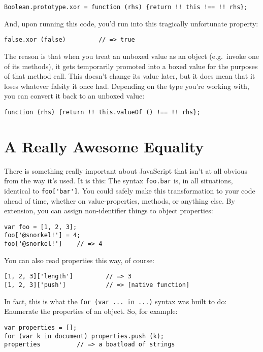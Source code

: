 \documentclass{article}
\begin{document}
\begin{verbatim}
Boolean.prototype.xor = function (rhs) {return !! this !== !! rhs};
\end{verbatim}

    And, upon running this code, you'd run into this tragically unfortunate property:

\begin{verbatim}
false.xor (false)         // => true
\end{verbatim}

    The reason is that when you treat an unboxed value as an object (e.g.~invoke one of its methods), it gets temporarily promoted into a boxed value for the purposes of that method call.
    This doesn't change its value later, but it does mean that it loses whatever falsity it once had. Depending on the type you're working with, you can convert it back to an unboxed value:

\begin{verbatim}
function (rhs) {return !! this.valueOf () !== !! rhs};
\end{verbatim}

\section {A Really Awesome Equality}
  \label{sec:a-really-awesome-equality}
  There is something really important about JavaScript that isn't at all obvious from the way it's used. It is this: The syntax \verb|foo.bar| is, in all situations, identical to
  \verb|foo['bar']|. You could safely make this transformation to your code ahead of time, whether on value-properties, methods, or anything else. By extension, you can assign non-identifier
  things to object properties:

\begin{verbatim}
var foo = [1, 2, 3];
foo['@snorkel!'] = 4;
foo['@snorkel!']    // => 4
\end{verbatim}

  You can also read properties this way, of course:

\begin{verbatim}
[1, 2, 3]['length']         // => 3
[1, 2, 3]['push']           // => [native function]
\end{verbatim}

  In fact, this is what the \verb|for (var ... in ...)| syntax was built to do: Enumerate the properties of an object. So, for example:

\begin{verbatim}
var properties = [];
for (var k in document) properties.push (k);
properties          // => a boatload of strings
\end{verbatim}
\end{document}
